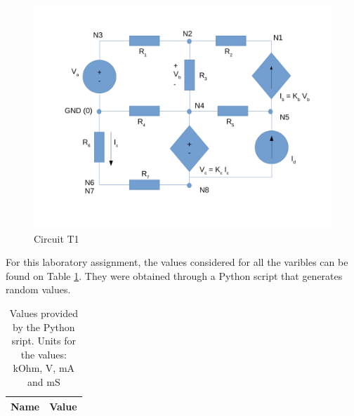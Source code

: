 \begin{figure}[h]
	\centering
	\includegraphics[width=0.85\linewidth]{dsnh_t1.pdf}
	\caption{Circuit T1}
\label{fig:Desenho_t1}
\end{figure}


\vspace{1cm}

For this laboratory assignment, the values considered for all the varibles can be
found on Table \ref{tab:given_vls}. They were obtained through a Python script that
generates random values. 

\begin{table}[h]
	\centering
	\begin{tabular}{|l|r|}
		\hline    
		{\bf Name} & {\bf Value} \\ \hline
    		
	\end{tabular}
	
	\caption{Values provided by the Python sript. Units for the values: kOhm, V, mA and mS}
    
\label{tab:given_vls}
\end{table}


